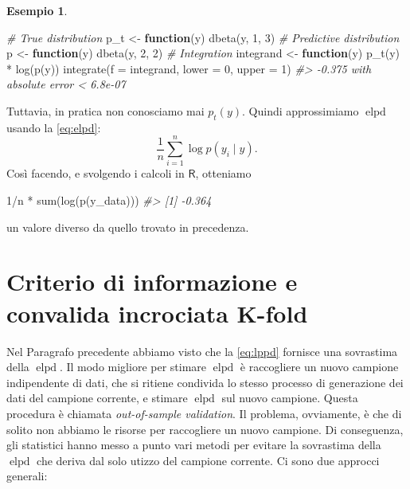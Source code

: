 \documentclass[
  10pt,
  italian,
  a4paper,
  extrafontsizes,onecolumn,openright
  ]{memoir}
\newenvironment{Shaded}{\begin{snugshade}}{\end{snugshade}}
\newcommand{\AttributeTok}[1]{\textcolor[rgb]{0.77,0.63,0.00}{#1}}
\newcommand{\CommentTok}[1]{\textcolor[rgb]{0.56,0.35,0.01}{\textit{#1}}}
\newcommand{\ControlFlowTok}[1]{\textcolor[rgb]{0.13,0.29,0.53}{\textbf{#1}}}
\newcommand{\DecValTok}[1]{\textcolor[rgb]{0.00,0.00,0.81}{#1}}
\newcommand{\FunctionTok}[1]{\textcolor[rgb]{0.00,0.00,0.00}{#1}}
\newcommand{\NormalTok}[1]{#1}
\newcommand{\OtherTok}[1]{\textcolor[rgb]{0.56,0.35,0.01}{#1}}
\newcommand{\SpecialCharTok}[1]{\textcolor[rgb]{0.00,0.00,0.00}{#1}}
\DeclareMathOperator{\elpd}{elpd} %
\newcommand{\R}{\textsf{R}} %
\theoremstyle{definition}
\theoremstyle{definition}
\newtheorem{example}{Esempio}[chapter]
\theoremstyle{definition}
\theoremstyle{definition}
\theoremstyle{remark}
\begin{document}
\begin{example}
\begin{Shaded}
\begin{Highlighting}[]
\CommentTok{\# True distribution}
\NormalTok{p\_t }\OtherTok{\textless{}{-}} \ControlFlowTok{function}\NormalTok{(y) }\FunctionTok{dbeta}\NormalTok{(y, }\DecValTok{1}\NormalTok{, }\DecValTok{3}\NormalTok{)}
\CommentTok{\# Predictive distribution}
\NormalTok{p }\OtherTok{\textless{}{-}} \ControlFlowTok{function}\NormalTok{(y) }\FunctionTok{dbeta}\NormalTok{(y, }\DecValTok{2}\NormalTok{, }\DecValTok{2}\NormalTok{)}
\CommentTok{\# Integration}
\NormalTok{integrand }\OtherTok{\textless{}{-}} \ControlFlowTok{function}\NormalTok{(y) }\FunctionTok{p\_t}\NormalTok{(y) }\SpecialCharTok{*} \FunctionTok{log}\NormalTok{(}\FunctionTok{p}\NormalTok{(y))}
\FunctionTok{integrate}\NormalTok{(}\AttributeTok{f =}\NormalTok{ integrand, }\AttributeTok{lower =} \DecValTok{0}\NormalTok{, }\AttributeTok{upper =} \DecValTok{1}\NormalTok{)}
\CommentTok{\#\textgreater{} {-}0.375 with absolute error \textless{} 6.8e{-}07}
\end{Highlighting}
\end{Shaded}

\noindent
Tuttavia, in pratica non conosciamo mai \(p_t(y)\). Quindi approssimiamo \(\elpd\) usando la \eqref{eq:elpd}:
\[
\frac{1}{n} \sum_{i=1}^n \log p(y_i \mid y).
\]
\noindent
Così facendo, e svolgendo i calcoli in \(\R\), otteniamo

\begin{Shaded}
\begin{Highlighting}[]
\DecValTok{1}\SpecialCharTok{/}\NormalTok{n }\SpecialCharTok{*} \FunctionTok{sum}\NormalTok{(}\FunctionTok{log}\NormalTok{(}\FunctionTok{p}\NormalTok{(y\_data)))}
\CommentTok{\#\textgreater{} [1] {-}0.364}
\end{Highlighting}
\end{Shaded}

\noindent
un valore diverso da quello trovato in precedenza.
\end{example}

\hypertarget{criterio-di-informazione-e-convalida-incrociata-k-fold}{%
\section{Criterio di informazione e convalida incrociata K-fold}\label{criterio-di-informazione-e-convalida-incrociata-k-fold}}

Nel Paragrafo precedente abbiamo visto che la \eqref{eq:lppd} fornisce una sovrastima della \(\elpd\). Il modo migliore per stimare \(\elpd\) è raccogliere un nuovo campione indipendente di dati, che si ritiene condivida lo stesso processo di generazione dei dati del campione corrente, e stimare \(\elpd\) sul nuovo campione. Questa procedura è chiamata \emph{out-of-sample validation}. Il problema, ovviamente, è che di solito non abbiamo le risorse per raccogliere un nuovo campione. Di conseguenza, gli statistici hanno messo a punto vari metodi per evitare la sovrastima della \(\elpd\) che deriva dal solo utizzo del campione corrente. Ci sono due approcci generali:
\end{document}
